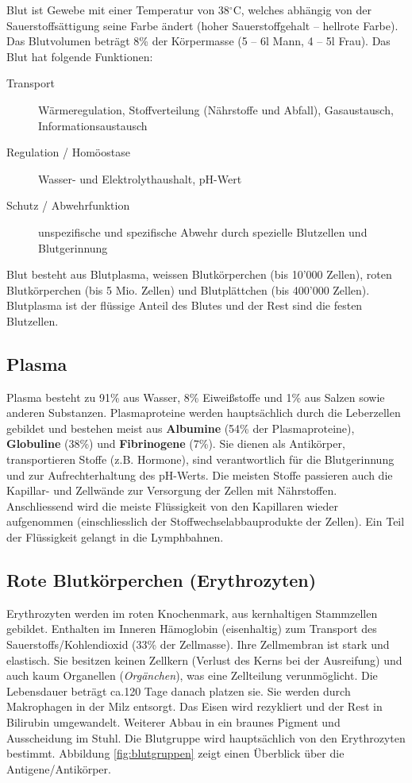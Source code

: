Blut ist Gewebe mit einer Temperatur von 38$^\circ$C, welches abhängig von der Sauerstoffsättigung seine Farbe ändert (hoher Sauerstoffgehalt -- hellrote Farbe). Das Blutvolumen beträgt 8\% der Körpermasse (5 – 6l Mann, 4 –
5l Frau). Das Blut hat folgende Funktionen:
\begin{description}
	\item[Transport] Wärmeregulation, Stoffverteilung (Nährstoffe und Abfall), Gasaustausch, Informationsaustausch
	\item[Regulation / Homöostase] Wasser- und Elektrolythaushalt, pH-Wert
	\item[Schutz / Abwehrfunktion] unspezifische und spezifische Abwehr durch spezielle Blutzellen und Blutgerinnung
\end{description}
Blut besteht aus Blutplasma, weissen Blutkörperchen (bis 10'000 Zellen), roten Blutkörperchen (bis 5 Mio. Zellen) und Blutplättchen (bis 400'000 Zellen). Blutplasma ist der flüssige Anteil des Blutes und der Rest sind die festen Blutzellen.

\subsection{Plasma}

Plasma besteht zu 91\% aus Wasser, 8\% Eiweißstoffe und 1\% aus Salzen sowie anderen Substanzen. Plasmaproteine werden hauptsächlich durch die Leberzellen gebildet und bestehen meist aus \textbf{Albumine} (54\% der Plasmaproteine), \textbf{Globuline} (38\%) und \textbf{Fibrinogene} (7\%). Sie dienen als Antikörper, transportieren Stoffe (z.B. Hormone), sind verantwortlich für die Blutgerinnung und zur Aufrechterhaltung des pH-Werts. Die meisten Stoffe passieren auch die Kapillar- und Zellwände zur Versorgung der Zellen mit Nährstoffen. Anschliessend wird die meiste Flüssigkeit von den Kapillaren wieder aufgenommen (einschliesslich der Stoffwechselabbauprodukte der Zellen). Ein Teil der Flüssigkeit gelangt in die Lymphbahnen.

\subsection{Rote Blutkörperchen (Erythrozyten)}

Erythrozyten werden im roten Knochenmark, aus kernhaltigen Stammzellen gebildet. Enthalten im Inneren Hämoglobin (eisenhaltig) zum Transport des Sauerstoffs/Kohlendioxid (33\% der Zellmasse). Ihre Zellmembran ist stark und elastisch. Sie besitzen keinen Zellkern (Verlust des Kerns bei der Ausreifung) und auch kaum Organellen (\textit{Orgänchen}), was eine Zellteilung verunmöglicht. Die Lebensdauer beträgt ca.120 Tage danach platzen sie. Sie werden durch Makrophagen in der Milz entsorgt. Das Eisen wird rezykliert und der Rest in Bilirubin umgewandelt. Weiterer Abbau in ein braunes Pigment und Ausscheidung im Stuhl. Die Blutgruppe wird hauptsächlich von den Erythrozyten bestimmt. Abbildung \ref{fig:blutgruppen} zeigt einen Überblick über die Antigene/Antikörper.

